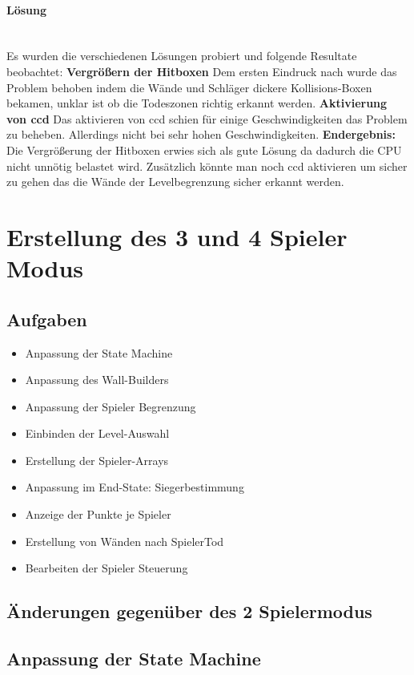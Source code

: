 \paragraph{Lösung}
\mbox{}\\
Es wurden die verschiedenen Lösungen probiert und folgende Resultate beobachtet:
\newline
\textbf{Vergrößern der Hitboxen} Dem ersten Eindruck nach wurde das Problem behoben indem die Wände und Schläger dickere Kollisions-Boxen bekamen, unklar ist ob die Todeszonen richtig erkannt werden.
\newline
\textbf{Aktivierung von ccd} Das aktivieren von ccd schien für einige Geschwindigkeiten das Problem zu beheben. Allerdings nicht bei sehr hohen Geschwindigkeiten.
\newline
\newline
\textbf{Endergebnis: } Die Vergrößerung der Hitboxen erwies sich als gute Lösung da dadurch die CPU nicht unnötig belastet wird. Zusätzlich könnte man noch ccd aktivieren um sicher zu gehen das die Wände der Levelbegrenzung sicher erkannt werden.

\section{Erstellung des 3 und 4 Spieler Modus}
\subsection{Aufgaben}
\begin{itemize}
\item
Anpassung der State Machine
\item
Anpassung des Wall-Builders
\item
Anpassung der Spieler Begrenzung
\item
Einbinden der Level-Auswahl
\item
Erstellung der Spieler-Arrays
\item
Anpassung im End-State: Siegerbestimmung
\item
Anzeige der Punkte je Spieler
\item
Erstellung von Wänden nach SpielerTod
\item
Bearbeiten der Spieler Steuerung
\end{itemize}
\subsection{Änderungen gegenüber des 2 Spielermodus}
\subsection{Anpassung der State Machine}
